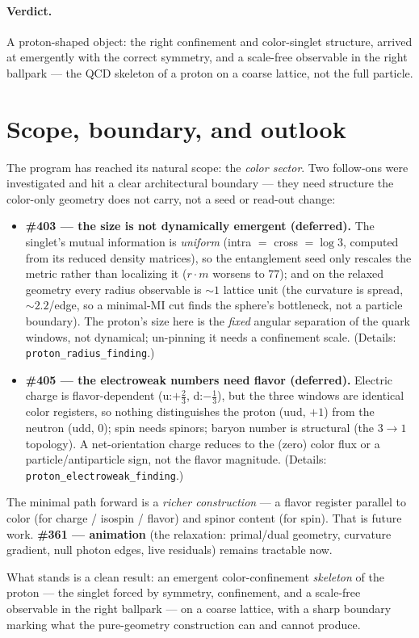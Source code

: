 \documentclass[11pt]{article}
\begin{document}
\paragraph{Verdict.} A proton-shaped object: the right confinement and color-singlet
structure, arrived at emergently with the correct symmetry, and a scale-free
observable in the right ballpark --- the QCD skeleton of a proton on a coarse lattice,
not the full particle.

\section{Scope, boundary, and outlook}
The program has reached its natural scope: the \emph{color sector}. Two follow-ons were
investigated and hit a clear architectural boundary --- they need structure the
color-only geometry does not carry, not a seed or read-out change:
\begin{itemize}[nosep]
  \item \textbf{\#403 --- the size is not dynamically emergent (deferred).} The singlet's
  mutual information is \emph{uniform} (intra $=$ cross $= \log 3$, computed from its
  reduced density matrices), so the entanglement seed only rescales the metric rather
  than localizing it ($r\!\cdot\!m$ worsens to $77$); and on the relaxed geometry every
  radius observable is $\sim 1$ lattice unit (the curvature is spread, $\sim 2.2$/edge,
  so a minimal-MI cut finds the sphere's bottleneck, not a particle boundary). The
  proton's size here is the \emph{fixed} angular separation of the quark windows, not
  dynamical; un-pinning it needs a confinement scale.
  (Details: \texttt{proton\_radius\_finding}.)
  \item \textbf{\#405 --- the electroweak numbers need flavor (deferred).} Electric
  charge is flavor-dependent (u:$+\tfrac23$, d:$-\tfrac13$), but the three windows are
  identical color registers, so nothing distinguishes the proton (uud, $+1$) from the
  neutron (udd, $0$); spin needs spinors; baryon number is structural (the $3\to1$
  topology). A net-orientation charge reduces to the (zero) color flux or a
  particle/antiparticle sign, not the flavor magnitude.
  (Details: \texttt{proton\_electroweak\_finding}.)
\end{itemize}
The minimal path forward is a \emph{richer construction} --- a flavor register parallel
to color (for charge / isospin / flavor) and spinor content (for spin). That is future
work. \textbf{\#361 --- animation} (the relaxation: primal/dual geometry, curvature
gradient, null photon edges, live residuals) remains tractable now.

What stands is a clean result: an emergent color-confinement \emph{skeleton} of the
proton --- the singlet forced by symmetry, confinement, and a scale-free observable in
the right ballpark --- on a coarse lattice, with a sharp boundary marking what the
pure-geometry construction can and cannot produce.
\end{document}
